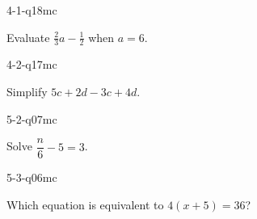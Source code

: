 \begin{practiceQuestion}{4-1-q18}{mc}
\begin{questionText}
Evaluate $\frac{2}{3}a - \frac{1}{2}$ when $a = 6$.


\begin{center}
\hspace{1cm}
\end{center}
\end{questionText}
\end{practiceQuestion}

\begin{practiceQuestion}{4-2-q17}{mc}
\begin{questionText}
Simplify $5c + 2d - 3c + 4d$.
\end{questionText}
\end{practiceQuestion}

\begin{practiceQuestion}{5-2-q07}{mc}
\begin{questionText}
Solve $\dfrac{n}{6} - 5 = 3$.
\end{questionText}
\end{practiceQuestion}

\begin{practiceQuestion}{5-3-q06}{mc}
\begin{questionText}
Which equation is equivalent to $4(x + 5) = 36$?
\end{questionText}
\end{practiceQuestion}

